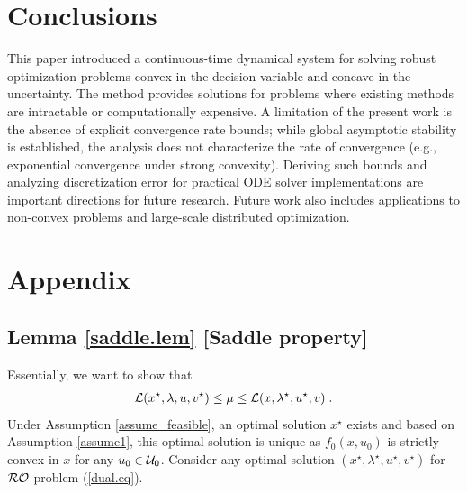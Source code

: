\documentclass[journal,twoside,web]{ieeecolor}
\newcommand{\rev}[1]{#1}
\begin{document}
\section{Conclusions}\label{section_conclusions}
This paper introduced a continuous-time dynamical system for solving robust optimization problems convex in the decision variable and concave in the uncertainty. The method provides solutions for problems where existing methods are intractable or computationally expensive. \rev{A limitation of the present work is the absence of explicit convergence rate bounds; while global asymptotic stability is established, the analysis does not characterize the rate of convergence (e.g., exponential convergence under strong convexity). Deriving such bounds and analyzing discretization error for practical ODE solver implementations are important directions for future research.} Future work also includes applications to non-convex problems and large-scale distributed optimization.
\section{Appendix} \label{section_appendix}

\subsection{Lemma \ref{saddle.lem} [Saddle property]}
Essentially, we want to show that
\begin{align*}
{\cal L}(x^\star,\lambda,u,v^\star)\leq \mu \leq {\cal L}(x,\lambda^\star,u^\star,v)\;.
\end{align*}
Under Assumption \ref{assume_feasible}, an optimal solution $x^\star$ exists and based on Assumption \ref{assume1}, this optimal solution is unique as $f_0(x,u_0)$ is strictly convex in $x$ for any $u_0 \in{\cal U}_0$. Consider any optimal solution $(x^\star,\lambda^\star,u^\star,v^\star)$ for ${\cal RO}$ problem (\ref{dual.eq}).
\end{document}

